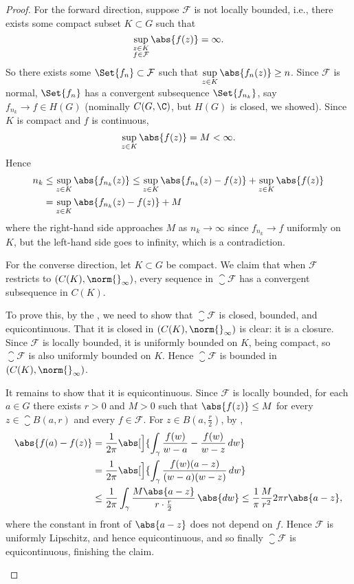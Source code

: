 \begin{proof}
	For the forward direction, suppose $\mathcal{F}$ is not locally bounded, i.e., there exists some compact subset $K \subset G$ such that
	\[
		\sup_{\substack{z \in K \\ f \in \mathcal{F}}} \abs{f(z)} = \infty.
	\]
	So there exists some $\Set{f_n} \subset \mathcal{F}$ such that $\sup\limits_{z \in K} \abs{f_n(z)} \geq n$.
	Since $\mathcal{F}$ is normal, $\Set{f_n}$ has a convergent subsequence $\Set{f_{n_k}}$, say $f_{n_k} \to f \in H(G)$ (nominally $C(G, \C)$, but $H(G)$ is closed, we showed).
	Since $K$ is compact and $f$ is continuous,
	\[
		\sup_{z \in K} \abs{f(z)} = M < \infty.
	\]
	Hence
	\begin{align*}
		n_k &\leq \sup_{z \in K} \abs{f_{n_k}(z)} \leq \sup_{z \in K} \abs{f_{n_k}(z) - f(z)} + \sup_{z \in K} \abs{f(z)} \\
		&= \sup_{z \in K} \abs{f_{n_k}(z) - f(z)} + M
	\end{align*}
	where the right-hand side approaches $M$ as $n_k \to \infty$ since $f_{n_k} \to f$ uniformly on $K$, but the left-hand side goes to infinity, which is a contradiction.

	For the converse direction, let $K \subset G$ be compact.
	We claim that when $\mathcal{F}$ restricts to $(C(K), \norm{}_\infty)$, every sequence in $\closure{\mathcal{F}}$ has a convergent subsequence in $C(K)$.

	To prove this, by the , we need to show that $\closure{\mathcal{F}}$ is closed, bounded, and equicontinuous.
	That it is closed in $(C(K), \norm{}_\infty)$ is clear: it is a closure.
	Since $\mathcal{F}$ is locally bounded, it is uniformly bounded on $K$, being compact, so $\closure{\mathcal{F}}$ is also uniformly bounded on $K$.
	Hence $\closure{\mathcal{F}}$ is bounded in $(C(K), \norm{}_\infty)$.

	It remains to show that it is equicontinuous.
	Since $\mathcal{F}$ is locally bounded, for each $a \in G$ there exists $r > 0$ and $M > 0$ such that $\abs{f(z)} \leq M$ for every $z \in \closure{B(a, r)}$ and every $f \in \mathcal{F}$.
	For $z \in B(a, \frac{r}{2})$, by ,
	\begin{align*}
		\abs{f(a) - f(z)} &= \frac{1}{2 \pi} \abs[\Big]{\int_\gamma \frac{f(w)}{w - a} - \frac{f(w)}{w - z} \, d w} \\
		&= \frac{1}{2 \pi} \abs[\Big]{\int_\gamma \frac{f(w) (a - z)}{(w - a) (w - z)} \, d w} \\
		&\leq \frac{1}{2 \pi} \int_\gamma \frac{M \abs{a - z}}{r \cdot \frac{r}{2}} \, \abs{d w} \leq \frac{1}{\pi} \frac{M}{r^2} 2 \pi r \abs{a - z},
	\end{align*}
	where the constant in front of $\abs{a - z}$ does not depend on $f$.
	Hence $\mathcal{F}$ is uniformly Lipschitz, and hence equicontinuous, and so finally $\closure{\mathcal{F}}$ is equicontinuous, finishing the claim.
	\begin{marginfigure}
		\centering


\end{marginfigure}
\end{proof}

